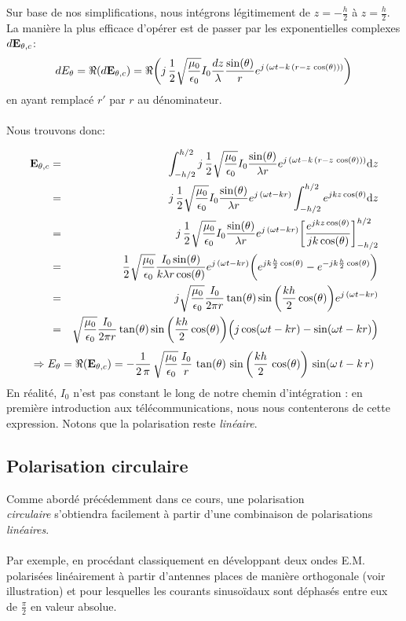 Sur base de nos simplifications, nous intégrons légitimement de $z=-\frac{h}{2}$ à $z=\frac{h}{2}$. La manière la plus efficace d'opérer est de passer par les exponentielles complexes $d\bold{E}_{\theta,c}$:
\[ dE_{\theta}=\Re(d\bold{E}_{\theta,c}) =  \Re\bigg(j\,\frac{1}{2}\sqrt{\frac{\mu_0}{\epsilon_0}}I_0 \frac{dz}{\lambda}\frac{\sin(\theta)}{r}e^{j\,(\omega t-k\,(r-z\,\cos(\theta)))}\bigg)\]
en ayant remplacé $r'$ par $r$ au dénominateur.\\ \\
Nous trouvons donc: 

\begin{align*}
\bold{E}_{\theta,c}&=&\int_{-h/2}^{h/2}j\,\frac{1}{2}\sqrt{\frac{\mu_0}{\epsilon_0}}I_0 \frac{\sin(\theta)}{\lambda r}e^{j\,(\omega t-k\,(r-z\,\cos(\theta)))} \mathrm{d}z \\
&=&j\,\frac{1}{2}\sqrt{\frac{\mu_0}{\epsilon_0}}I_0\frac{\sin(\theta)}{\lambda r}e^{j\,(\omega t-kr)} \int_{-h/2}^{h/2}e^{jkz\cos(\theta)} \mathrm{d}z \\
&=&j\,\frac{1}{2}\sqrt{\frac{\mu_0}{\epsilon_0}}I_0\frac{\sin(\theta)}{\lambda r}e^{j\,(\omega t-kr)} \bigg[\frac{e^{jkz\cos(\theta)}}{jk\cos(\theta)}  \bigg]_{-h/2}^{h/2}\\
&=&\frac{1}{2}\sqrt{\frac{\mu_0}{\epsilon_0}}\frac{I_0\sin(\theta)}{k\lambda r\cos(\theta)}e^{j\,(\omega t-kr)} \bigg(e^{jk\frac{h}{2}\cos(\theta)}-e^{-jk\frac{h}{2}\cos(\theta)}\bigg)\\
&=&j\sqrt{\frac{\mu_0}{\epsilon_0}}\frac{I_0}{2\pi r}\tan(\theta)\sin\bigg(\frac{kh}{2}\cos(\theta)\bigg) e^{j\,(\omega t-kr)}\\
&=&\sqrt{\frac{\mu_0}{\epsilon_0}}\frac{I_0}{2\pi r}\tan(\theta)\sin\bigg(\frac{kh}{2}\cos(\theta)\bigg) \Big(j\cos(\omega t-kr)-\sin(\omega t-kr)\Big)
\end{align*}
\[ \Rightarrow E_{\theta} = \Re(\bold{E}_{\theta,c})= -\frac{1}{2\,\pi}\,\sqrt{\frac{\mu_0}{\epsilon_0}}\,\frac{I_0}{r}\,\tan(\theta)\, \sin\bigg(\frac{kh}{2}\,\cos(\theta)\bigg)\,\sin(\omega\,t-k\,r)   \]
En réalité, $I_0$ n'est pas constant le long de notre chemin d'intégration : en première introduction aux télécommunications, nous nous contenterons de cette expression. Notons que la polarisation reste \textit{linéaire}. 



\subsection{Polarisation circulaire}
Comme abordé précédemment dans ce cours, une polarisation \\\textit{circulaire} s'obtiendra facilement à partir d'une combinaison de polarisations \textit{linéaires}. \\ \\Par exemple, en procédant classiquement en développant deux ondes E.M. polarisées linéairement à partir d'antennes places de manière orthogonale (voir illustration) et pour lesquelles les courants sinusoïdaux sont déphasés entre eux de $\frac{\pi}{2}$ en valeur absolue. 

